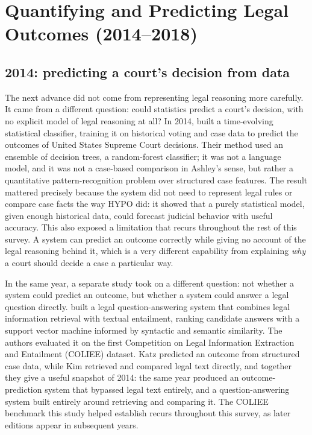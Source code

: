 \section{Quantifying and Predicting Legal Outcomes (2014--2018)}
\label{sec:outcomes}

\subsection{2014: predicting a court's decision from data}

The next advance did not come from representing legal reasoning more carefully. It came from a
different question: could statistics predict a court's decision, with no explicit model of legal
reasoning at all? In 2014, \citet{katz2014} built a time-evolving statistical classifier, training it
on historical voting and case data to predict the outcomes of United States Supreme Court decisions.
Their method used an ensemble of decision trees, a random-forest classifier; it was not a language
model, and it was not a case-based comparison in Ashley's sense, but rather a quantitative
pattern-recognition problem over structured case features. The result mattered precisely because the
system did not need to represent legal rules or compare case facts the way HYPO did: it showed that
a purely statistical model, given enough historical data, could forecast judicial behavior with
useful accuracy. This also exposed a limitation that recurs throughout the rest of this survey. A
system can predict an outcome correctly while giving no account of the legal reasoning behind it,
which is a very different capability from explaining \emph{why} a court should decide a case a
particular way.

In the same year, a separate study took on a different question: not whether a system could predict
an outcome, but whether a system could answer a legal question directly. \citet{kim2014} built a
legal question-answering system that combines legal information retrieval with textual entailment,
ranking candidate answers with a support vector machine informed by syntactic and semantic
similarity. The authors evaluated it on the first Competition on Legal Information Extraction and
Entailment (COLIEE) dataset. Katz predicted an outcome from structured case data, while Kim retrieved
and compared legal text directly, and together they give a useful snapshot of 2014: the same year
produced an outcome-prediction system that bypassed legal text entirely, and a question-answering
system built entirely around retrieving and comparing it. The COLIEE benchmark this study helped
establish recurs throughout this survey, as later editions appear in subsequent years.

